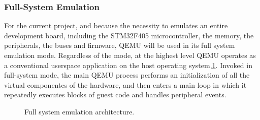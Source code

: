 \subsubsection{Full-System Emulation}
\label{chap:Back_QEMU_FSE}

For the current project, and because the necessity to emulates an entire development 
board, including the STM32F405 microcontroller, the memory, the peripherals, 
the buses and firmware, QEMU will be used in its full system emulation mode.
Regardless of the mode, at the highest level QEMU operates as a conventional userspace 
application on the host operating system,\ref{fig:full_system_emulation}. Invoked in full-system mode, the 
main QEMU process performs an initialization of all the virtual componentes of the 
hardware, and then enters a main loop in which it repeatedly executes blocks of 
guest code and handles peripheral events.

\begin{figure}[htbp]
    \centering
    \caption{Full system emulation architecture.}
    \label{fig:full_system_emulation}
\end{figure}